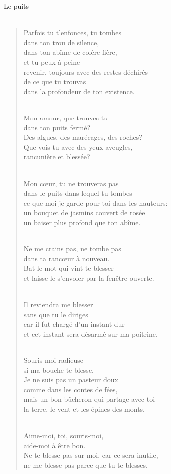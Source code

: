 \documentclass[11pt,a4paper]{book}
\begin{document}
{\huge Le puits} \\ \\

\begin{verse}
Parfois tu t'enfonces, tu tombes \\
dans ton trou de silence, \\
dans ton abîme de colère fière, \\
et tu peux à peine \\
revenir, toujours avec des restes déchirés \\
de ce que tu trouvas \\
dans la profondeur de ton existence. \\ \

Mon amour, que trouves-tu \\
dans ton puits fermé? \\
Des algues, des marécages, des roches? \\
Que vois-tu avec des yeux aveugles, \\
rancunière et blessée? \\ \

Mon c{\oe}ur, tu ne trouveras pas \\
dans le puits dans lequel tu tombes \\
ce que moi je garde pour toi dans les hauteurs: \\
un bouquet de jasmins couvert de rosée \\
un baiser plus profond que ton abîme. \\ \

Ne me crains pas, ne tombe pas \\
dans ta ranc{\oe}ur à nouveau. \\
Bat le mot qui vint te blesser \\
et laisse-le s'envoler par la fenêtre ouverte. \\ \

Il reviendra me blesser \\
sans que tu le diriges \\
car il fut chargé d'un instant dur \\
et cet instant sera désarmé sur ma poitrine. \\ \

Souris-moi radieuse \\
si ma bouche te blesse. \\
Je ne suis pas un pasteur doux \\
comme dans les contes de fées, \\
mais un bon bûcheron qui partage avec toi \\
la terre, le vent et les épines des monts. \\ \

Aime-moi, toi, souris-moi, \\
aide-moi à être bon. \\
Ne te blesse pas sur moi, car ce sera inutile, \\
ne me blesse pas parce que tu te blesses.
\end{verse}
\end{document}
